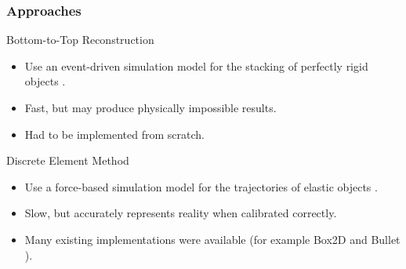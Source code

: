 \documentclass[sumlimits, intlimits]{beamer}
\begin{document}
\begin{frame}
\frametitle{Approaches}
\begin{block}{Bottom-to-Top Reconstruction}
\begin{itemize}
\item Use an event-driven simulation model
for the stacking of perfectly rigid objects \cite{poschel-2005}.
\item Fast, but may produce physically impossible results.
\item Had to be implemented from scratch.
\end{itemize}
\end{block}
\begin{block}{Discrete Element Method}
\begin{itemize}
\item Use a force-based simulation model
for the trajectories of elastic objects \cite{poschel-2005}.
\item Slow, but accurately represents reality when calibrated correctly.
\item Many existing implementations were available
(for example Box2D \cite{box2d} and Bullet \cite{bullet}).
\end{itemize}
\end{block}
\end{frame}
\end{document}
